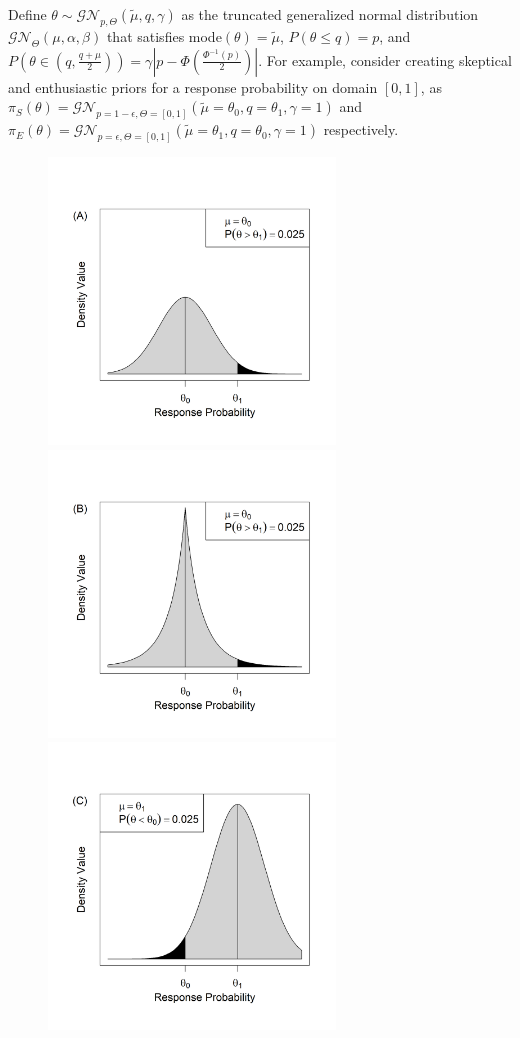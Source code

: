 \documentclass[useAMS,usenatbib,referee]{biom}
\begin{document}
Define $\theta\sim\mathcal{GN}_{p,\Theta}(\tilde{\mu},q,\gamma)$ as the truncated generalized normal distribution $\mathcal{GN}_\Theta(\mu,\alpha,\beta)$ that satisfies mode$(\theta)=\tilde{\mu}$, $P(\theta\leq q)=p$, and $P(\theta\in(q,\frac{q+\mu}{2}))=\gamma|p-\Phi(\frac{\Phi^{-1}(p)}{2})|$.
%
For example, consider creating skeptical and enthusiastic priors for a response probability on domain $[0,1]$, as $
\pi_S(\theta)=\mathcal{GN}_{p=1-\epsilon,\Theta=[0,1]}(\tilde{\mu}=\theta_0,q=\theta_1,\gamma=1)$ and $
\pi_E(\theta)=\mathcal{GN}_{p=\epsilon,\Theta=[0,1]}(\tilde{\mu}=\theta_1,q=\theta_0,\gamma=1)$ respectively.
\begin{figure}
\begin{center}
\includegraphics[width=3in]{../00-paper/FIGURES/figure1a.png}
\includegraphics[width=3in]{../00-paper/FIGURES/figure1b.png}
\includegraphics[width=3in]{../00-paper/FIGURES/figure1c.png}

\end{center}
\end{figure}
\end{document}
